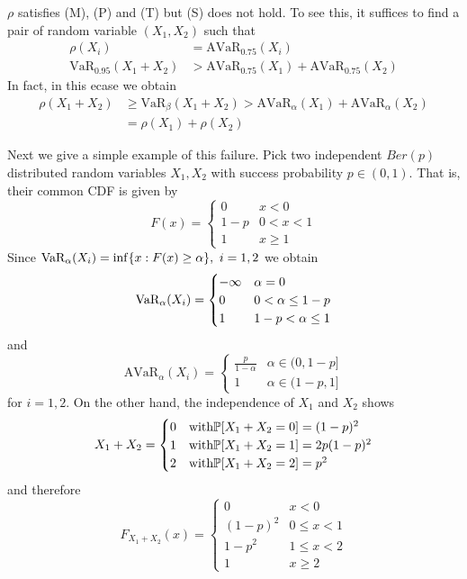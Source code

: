 $\rho$ satisfies (M), (P) and (T) but (S) does not hold. To see this, it suffices to find a pair of random variable $(X_1, X_2)$ such that
\begin{align*}
    \rho(X_i) &= \text{AVaR}_{0.75}(X_i) \\
    \text{VaR}_{0.95}(X_1 + X_2) &> \text{AVaR}_{0.75}(X_1) + \text{AVaR}_{0.75}(X_2)
\end{align*}
In fact, in this ecase we obtain
\begin{align*}
    \rho(X_1 + X_2) & \geq \text{VaR}_\beta(X_1 + X_2) > \text{AVaR}_\alpha(X_1) + \text{AVaR}_\alpha(X_2) \\
    &= \rho(X_1) + \rho(X_2)
\end{align*}

Next we give a simple example of this failure. Pick two independent $Ber(p)$distributed random variables $X_1, X_2$ with success probability $p\in(0,1)$. That is, their common CDF is given by
\[
    F(x) =
    \begin{cases}
        0 & x < 0\\
        1 - p & 0 < x < 1 \\
        1 & x \geq 1
    \end{cases}
\]
Since $\VaR(X_i) = \inf\{x : F(x) \geq \alpha\}, \ i=1,2$ we obtain
\[
    \text{VaR}_\alpha(X_i) =
    \begin{cases}
            -\infty & \alpha = 0\\
            0 & 0 < \alpha \leq 1-p \\
            1 & 1-p < \alpha \leq 1
    \end{cases}
\]
and
\[
    \text{AVaR}_\alpha(X_i) =
    \begin{cases}
        \frac{p}{1-\alpha} & \alpha \in (0, 1-p] \\
        1 & \alpha \in (1-p, 1]
    \end{cases}
\]
for $i = 1,2$. On the other hand, the independence of $X_1$ and $X_2$ shows
\[
    X_1 + X_2 =
    \begin{cases}
        0 & \text{with} \mathbb{P}[X_1 + X_2 = 0] = (1-p)^2 \\
        1 & \text{with} \mathbb{P}[X_1 + X_2 = 1] = 2p(1-p)^2 \\
        2 & \text{with} \mathbb{P}[X_1 + X_2 = 2] = p^2 \\
    \end{cases}
\]
and therefore
\[
    F_{X_1+X_2}(x) =
    \begin{cases}
        0 & x<0 \\
        (1-p)^2 & 0 \leq x < 1 \\
        1 - p^2 & 1 \leq x < 2 \\
        1 & x \geq 2
    \end{cases}
\]
